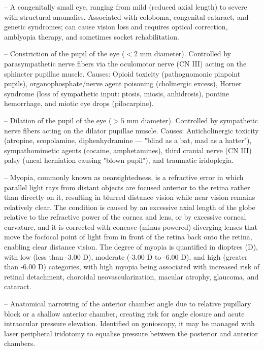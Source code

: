 -- A congenitally small eye, ranging from mild (reduced axial length) to severe with structural anomalies. Associated with coloboma, congenital cataract, and genetic syndromes; can cause vision loss and requires optical correction, amblyopia therapy, and sometimes socket rehabilitation.

-- Constriction of the pupil of the eye ($<2\text{ mm}$ diameter). Controlled by parasympathetic nerve fibers via the oculomotor nerve (CN III) acting on the sphincter pupillae muscle. Causes: Opioid toxicity (pathognomonic pinpoint pupils), organophosphate/nerve agent poisoning (cholinergic excess), Horner syndrome (loss of sympathetic input: ptosis, miosis, anhidrosis), pontine hemorrhage, and miotic eye drops (pilocarpine).

-- Dilation of the pupil of the eye ($>5\text{ mm}$ diameter). Controlled by sympathetic nerve fibers acting on the dilator pupillae muscle. Causes: Anticholinergic toxicity (atropine, scopolamine, diphenhydramine — "blind as a bat, mad as a hatter"), sympathomimetic agents (cocaine, amphetamines), third cranial nerve (CN III) palsy (uncal herniation causing "blown pupil"), and traumatic iridoplegia.

-- Myopia, commonly known as nearsightedness, is a refractive error in which parallel light rays from distant objects are focused anterior to the retina rather than directly on it, resulting in blurred distance vision while near vision remains relatively clear. The condition is caused by an excessive axial length of the globe relative to the refractive power of the cornea and lens, or by excessive corneal curvature, and it is corrected with concave (minus-powered) diverging lenses that move the focfocal point of light from in front of the retina back onto the retina, enabling clear distance vision. The degree of myopia is quantified in dioptres (D), with low (less than -3.00 D), moderate (-3.00 D to -6.00 D), and high (greater than -6.00 D) categories, with high myopia being associated with increased risk of retinal detachment, choroidal neovascularization, macular atrophy, glaucoma, and cataract.

-- Anatomical narrowing of the anterior chamber angle due to relative pupillary block or a shallow anterior chamber, creating risk for angle closure and acute intraocular pressure elevation. Identified on gonioscopy, it may be managed with laser peripheral iridotomy to equalise pressure between the posterior and anterior chambers.

